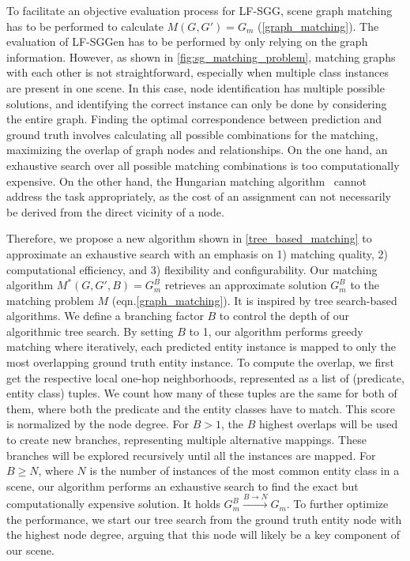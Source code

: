\documentclass[10pt,twocolumn,letterpaper]{article}
\begin{document}
To facilitate an objective evaluation process for LF-SGG, scene graph matching has to be performed to calculate $M\left( G,G' \right) = G_{m}$ (\cref{graph_matching}). The evaluation of LF-SGGen has to be performed by only relying on the graph information. However, as shown in \cref{fig:sg_matching_problem}, matching graphs with each other is not straightforward, especially when multiple class instances are present in one scene. In this case, node identification has multiple possible solutions, and identifying the correct instance can only be done by considering the entire graph. Finding the optimal correspondence between prediction and ground truth involves calculating all possible combinations for the matching, maximizing the overlap of graph nodes and relationships. On the one hand, an exhaustive search over all possible matching combinations is too computationally expensive. On the other hand, the Hungarian matching algorithm~\cite{kuhn_hungarian_1955} cannot address the task appropriately, as the cost of an assignment can not necessarily be derived from the direct vicinity of a node.

Therefore, we propose a new algorithm shown in \cref{tree_based_matching} to approximate an exhaustive search with an emphasis on 1) matching quality, 2) computational efficiency, and 3) flexibility and configurability. Our matching algorithm $M^{\ast}\left( G,G',B \right) = G_{m}^{B}$ retrieves an approximate solution $G_{m}^{B}$ to the matching problem $M$ (eqn.\ref{graph_matching}). It is inspired by tree search-based algorithms. We define a branching factor $B$ to control the depth of our algorithmic tree search. By setting $B$ to 1, our algorithm performs greedy matching where iteratively, each predicted entity instance is mapped to only the most overlapping ground truth entity instance. To compute the overlap, we first get the respective local one-hop neighborhoods, represented as a list of (predicate, entity class) tuples. We count how many of these tuples are the same for both of them, where both the predicate and the entity classes have to match. This score is normalized by the node degree. For $B > 1$, the $B$ highest overlaps will be used to create new branches, representing multiple alternative mappings. These branches will be explored recursively until all the instances are mapped. For $B \geq N$, where $N$ is the number of instances of the most common entity class in a scene, our algorithm performs an exhaustive search to find the exact but computationally expensive solution. It holds $G_{m}^{B} \xrightarrow{B \to N} G_{m}$. To further optimize the performance, we start our tree search from the ground truth entity node with the highest node degree, arguing that this node will likely be a key component of our scene.
\end{document}
